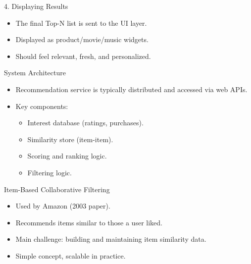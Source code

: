 \documentclass{beamer}
\begin{document}
\begin{frame}{4. Displaying Results}
\begin{itemize}
    \item The final Top-N list is sent to the UI layer.
    \item Displayed as product/movie/music widgets.
    \item Should feel relevant, fresh, and personalized.
\end{itemize}
\end{frame}

\begin{frame}{System Architecture}
\begin{itemize}
    \item Recommendation service is typically distributed and accessed via web APIs.
    \item Key components:
    \begin{itemize}
        \item Interest database (ratings, purchases).
        \item Similarity store (item-item).
        \item Scoring and ranking logic.
        \item Filtering logic.
    \end{itemize}
\end{itemize}
\end{frame}

\begin{frame}{Item-Based Collaborative Filtering}
\begin{itemize}
    \item Used by Amazon (2003 paper).
    \item Recommends items similar to those a user liked.
    \item Main challenge: building and maintaining item similarity data.
    \item Simple concept, scalable in practice.
\end{itemize}
\end{frame}
\end{document}
